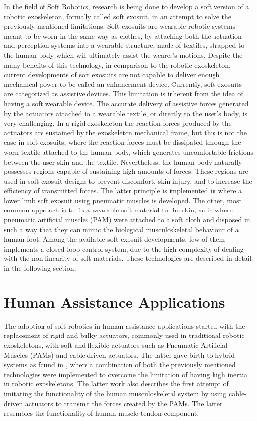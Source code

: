 In the field of Soft Robotics, research is being done to develop a soft version of a robotic exoskeleton, formally called soft exosuit, in an attempt to solve the previously mentioned limitations. Soft exosuits are wearable robotic systems meant to be worn in the same way as clothes, by attaching both the actuation and perception systems into a wearable structure, made of textiles, strapped to the human body which will ultimately assist the wearer's motions. Despite the many benefits of this technology, in comparison to the robotic exoskeleton, current developments of soft exosuits are not capable to deliver enough mechanical power to be called an enhancement device. Currently, soft exosuits are categorized as assistive devices. This limitation is inherent from the idea of having a soft wearable device. The accurate delivery of assistive forces generated by the actuators attached to a wearable textile, or directly to the user's body, is very challenging. In a rigid exoskeleton the reaction forces produced by the actuators are sustained by the exoskeleton mechanical frame, but this is not the case in soft exosuits, where the reaction forces must be dissipated through the worn textile attached to the human body, which generates uncomfortable frictions between the user skin and the textile. Nevertheless, the human body naturally possesses regions capable of sustaining high amounts of forces. These regions are used in soft exosuit designs to prevent discomfort, skin injury, and to increase the efficiency of transmitted forces. The latter principle is implemented in \cite{wehner2013lightweight} where a lower limb soft exosuit using pneumatic muscles is developed. The other, most common approach is to fix a wearable soft material to the skin, as in \cite{park2014design,park2011bio} where pneumatic artificial muscles (PAM) were attached to a soft cloth and disposed in such a way that they can mimic the biological musculoskeletal behaviour of a human foot. Among the available soft exosuit developments, few of them implements a closed loop control system, due to the high complexity of dealing with the non-linearity of soft materials. These technologies are described in detail in the following section.

\section{Human Assistance Applications}


The adoption of soft robotics in human assistance applications started with the replacement of rigid and bulky actuators, commonly used in traditional robotic exoskeletons, with soft and flexible actuators such as Pneumatic Artificial Muscles (PAMs) and cable-driven actuators. The latter gave birth to hybrid systems as found in \cite{Noda2014}, where a combination of both the previously mentioned technologies were implemented to overcome the limitation of having high inertia in robotic exoskeletons. The latter work also describes the first attempt of imitating the functionality of the human musculoskeletal system by using cable-driven actuators to transmit the forces created by the PAMs. The latter resembles the functionality of human muscle-tendon component.

